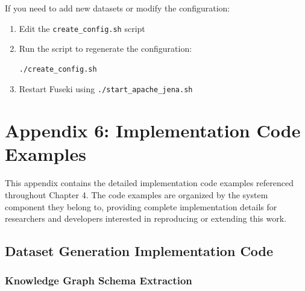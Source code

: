 If you need to add new datasets or modify the configuration:

\begin{enumerate}
    \item Edit the \texttt{create\_config.sh} script
    \item Run the script to regenerate the configuration:
    \begin{lstlisting}[language=bash]
./create_config.sh
    \end{lstlisting}
    \item Restart Fuseki using \texttt{./start\_apache\_jena.sh}
\end{enumerate}

\chapter*{Appendix 6: Implementation Code Examples}
\label{sec:implementation-code}

This appendix contains the detailed implementation code examples referenced throughout Chapter 4. The code examples are organized by the system component they belong to, providing complete implementation details for researchers and developers interested in reproducing or extending this work.

\section*{Dataset Generation Implementation Code}

\subsection*{Knowledge Graph Schema Extraction}

